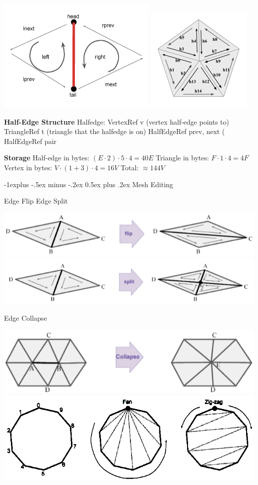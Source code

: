 \documentclass[letterpaper, 8pt]{extarticle}
\makeatletter
\renewcommand{\section}{\@startsection{section}{1}{0mm}%
                                {-1explus -.5ex minus -.2ex}%
                                {0.5ex plus .2ex}%
                                {\normalfont\small\bfseries}}
\makeatother
\begin{document}
\begin{multicols*}{4}
    \includegraphics[width=.3\linewidth]{winged-edge.png}
    \includegraphics[width=.2\linewidth]{half-edge.png}

    \textbf{Half-Edge Structure}
    Halfedge:
    VertexRef v (vertex half-edge points to)
    TriangleRef t (triangle that the halfedge is on)
    HalfEdgeRef prev, next (
    HalfEdgeRef pair

    \textbf{Storage}
    Half-edge in bytes: $(E \cdot 2) \cdot 5 \cdot 4 = 40E$
    Triangle in bytes: $F \cdot 1 \cdot 4 = 4F$
    Vertex in bytes: $V \cdot (1 + 3) \cdot 4 = 16V$
    Total: $\approx 144V$

    \section{Mesh Editing}

    Edge Flip \quad\quad\quad\quad\quad\quad\quad\quad\quad Edge Split

    \includegraphics[width=.45\linewidth]{edge-flip.png}
    \includegraphics[width=.45\linewidth]{edge-split.png}

    Edge Collapse

    \includegraphics[width=.45\linewidth]{edge-collapse.png}
    \includegraphics[width=.45\linewidth]{triangulation.png}


\end{multicols*}
\end{document}
